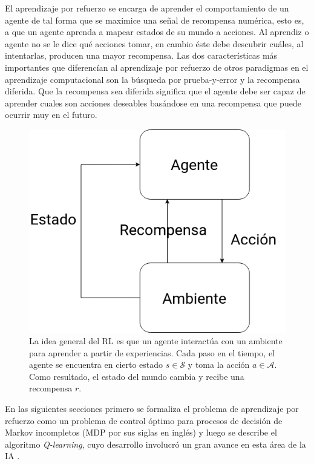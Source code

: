 El aprendizaje por refuerzo se encarga de aprender el comportamiento de un agente 
de tal forma que se maximice una señal de recompensa numérica, esto es, a que un
agente aprenda a mapear estados de su mundo a acciones. Al aprendiz o agente no se le 
dice qué acciones tomar, en cambio éste debe descubrir cuáles, al intentarlas, producen
una mayor recompensa. Las dos características más importantes que diferencían al
aprendizaje por refuerzo de otros paradigmas en el aprendizaje computacional son 
la búsqueda por prueba-y-error y la recompensa diferida. Que la recompensa sea diferida significa que el agente debe ser 
capaz de aprender cuales son acciones deseables basándose en una recompensa que puede ocurrir muy en el futuro.

\begin{figure}[h]
    \centering
    \includegraphics[scale=0.4]{Chapter2/Figs/agend_interaction.png}
    \caption{La idea general del RL es que un agente interactúa con un ambiente para
    aprender a partir de experiencias. Cada paso en el tiempo, el agente se encuentra
    en cierto estado $s\in \mathcal{S}$ y toma la acción $a \in \mathcal{A}$. Como
    resultado, el estado del mundo cambia y recibe una recompensa $r$.}
\end{figure}

En las siguientes secciones primero se formaliza el problema de aprendizaje por refuerzo como
un problema de control óptimo para procesos de decisión de Markov incompletos (MDP por sus siglas en inglés) y luego se
describe el algoritmo \textit{Q-learning}, cuyo desarrollo involucró un gran avance en esta área de la IA  .

